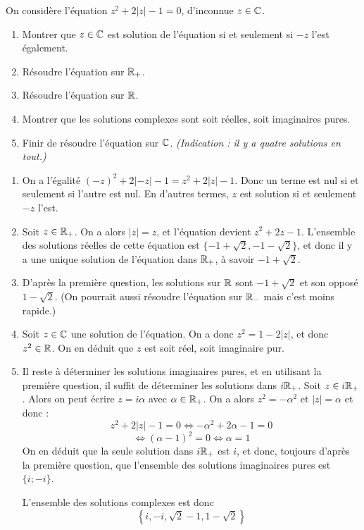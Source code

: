 \begin{exo}
On considère l'équation $z^2+2|z|-1=0$, d'inconnue $z\in \mathbb{C}$.
\begin{enumerate}
\item Montrer que $z\in\mathbb{C}$ est solution de l'équation si et seulement si $-z$ l'est également.
\item Résoudre l'équation sur $\mathbb{R}_+$.
\item Résoudre l'équation sur $\mathbb{R}$.
\item Montrer que les solutions complexes sont soit réelles, soit imaginaires pures. 
\item Finir de résoudre l'équation sur $\mathbb{C}$. \emph{(Indication : il y a quatre solutions en tout.)}
\end{enumerate}
\begin{sol}
\begin{enumerate}
\item On a l'égalité $(-z)^2+2|-z|-1 = z^2+2|z|-1$. Donc un terme est nul si et seulement si l'autre est nul. En d'autres termes, $z$ est solution si et seulement $-z$ l'est.

\item Soit $z\in \mathbb{R}_+$. On a alors $|z|=z$, et l'équation devient $z^2+2z-1$. L'ensemble des solutions réelles de cette équation est $\{-1+\sqrt 2, -1-\sqrt 2\}$, et donc il y a une unique solution de l'équation dans $\mathbb{R}_+$, à savoir $-1+\sqrt 2$.
\item D'après la première question, les solutions sur $\mathbb{R}$ sont $-1+\sqrt 2$ et son opposé $1-\sqrt 2$. (On pourrait aussi résoudre l'équation sur $\mathbb{R}_-$ mais c'est moins rapide.)
\item Soit $z\in\mathbb{C}$ une solution de l'équation. On a donc $z^2=1-2|z|$, et donc $z^2\in \mathbb{R}$. On en déduit que $z$ est soit réel, soit imaginaire pur.
\item Il reste à déterminer les solutions imaginaires pures, et en utilisant la première question, il suffit de déterminer les solutions dans $i\mathbb{R}_+$. Soit $z\in i\mathbb{R}_+$. Alors on peut écrire $z=i\alpha$ avec $\alpha\in\mathbb{R}_+$. On a alors $z^2=-\alpha^2$ et $|z|=\alpha$ et donc :
\[ z^2+2|z|-1=0\iff -\alpha^2+2\alpha-1 =0\]
\[\iff (\alpha-1)^2=0 \iff \alpha=1\]
On en déduit que la seule solution dans $i\mathbb{R}_+$ est $i$, et donc, toujours d'après la première question, que l'ensemble des solutions imaginaires pures est $\{i;-i\}$.

L'ensemble des solutions complexes est donc 
\[ \boxed{\left\{i,-i,\sqrt 2-1, 1-\sqrt 2\right\}}\]
\end{enumerate}
\end{sol}
\end{exo}




